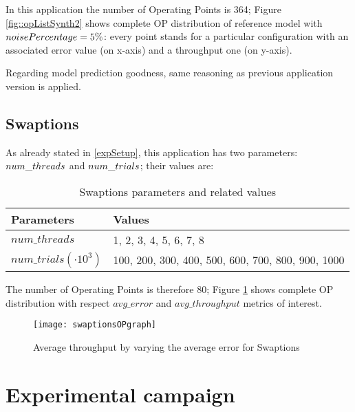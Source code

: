 In this application the number of Operating Points is 364; Figure \ref{fig::opListSynth2} shows complete OP distribution of reference model with $noise\-Per\-cent\-age = 5\%$: every point stands for a particular configuration with an associated error value (on x-axis) and a throughput one (on y-axis).

Regarding model prediction goodness, same reasoning as previous application version is applied.


\subsection{Swaptions}

As already stated in \ref{expSetup}, this application has two parameters: $num\_\-threads$ and $num\_\-trials$; their values are:

\begin{table}[H]

    \centering

    \begin{tabular}{ll}
    
        \toprule
        Parameters & Values \\
        \midrule
        $num\_threads$ & 1, 2, 3, 4, 5, 6, 7, 8 \\
        $num\_trials (\cdot 10^3)$ & 100, 200, 300, 400, 500, 600, 700, 800, 900, 1000 \\
        \bottomrule 
    
    \end{tabular}

    \caption{Swaptions parameters and related values}

\end{table}

The number of Operating Points is therefore 80; Figure \ref{fig::swaptionsOPs} shows complete OP distribution with respect $avg\_error$ and $avg\_throughput$ metrics of interest.

\begin{figure}[ht]

    \centering
    \texttt{[image: swaptionsOPgraph]}
    \caption{Average throughput by varying the average error for Swaptions}
    \label{fig::swaptionsOPs}
    
\end{figure}





\section{Experimental campaign}\label{campaign}

